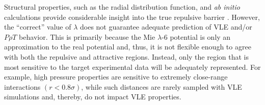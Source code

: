 \documentclass[preprint,letterpaper,floatfix,citeautoscript,aip,jcp]{revtex4-1}
\begin{document}
Structural properties, such as the radial distribution function, and \textit{ab initio} calculations provide considerable insight into the true repulsive barrier \cite{Kulakova2017,Galliero2005}. However, the ``correct'' value of $\lambda$ does not guarantee adequate prediction of VLE and/or $P \rho T$ behavior. This is primarily because the Mie $\lambda$-6 potential is only an approximation to the real potential and, thus, it is not flexible enough to agree with both the repulsive and attractive regions. Instead, only the region that is most sensitive to the target experimental data will be adequately represented. For example, high pressure properties are sensitive to extremely close-range interactions $(r < 0.8 \sigma)$, while such distances are rarely sampled with VLE simulations and, thereby, do not impact VLE properties. 
\end{document}
